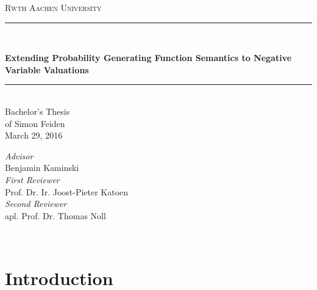 \documentclass[12pt]{article}
\newcommand{\HRule}{\rule{\linewidth}{0.5mm}}	%
\begin{document}
	
\begin{titlepage}
	\center
	
	\vspace*{1cm}
	
	\textsc{\LARGE Rwth Aachen University}\\[2cm]
	
	
	\HRule \\[0.4cm]
	\begin{onehalfspace}
		\LARGE \bfseries Extending Probability Generating Function Semantics to Negative Variable Valuations
	\end{onehalfspace}
	\HRule \\[1.5cm]


	{\large Bachelor's Thesis} \\[0.4cm]
	{\large of Simon Feiden } \\[0.4cm]
	{\small March 29, 2016} \\[5cm]
	
	
	\begin{minipage}{0.7\textwidth}
		\begin{flushleft} \large
			\emph{Advisor} \\
			Benjamin Kaminski \\[0.2cm]
			\emph{First Reviewer} \\
			Prof. Dr. Ir. Joost-Pieter Katoen \\[0.2cm]
			\emph{Second Reviewer} \\
			apl. Prof. Dr. Thomas Noll
		\end{flushleft}
	\end{minipage}
	~
	\begin{minipage}{0.1\textwidth}
		\begin{flushright}
		\end{flushright}
	\end{minipage}
	
	\vfill
\end{titlepage}


\null
\thispagestyle{empty}
\newpage





\null
\thispagestyle{empty}
\newpage



\newpage


\tableofcontents
\newpage


\section{Introduction}

\newpage
\end{document}
